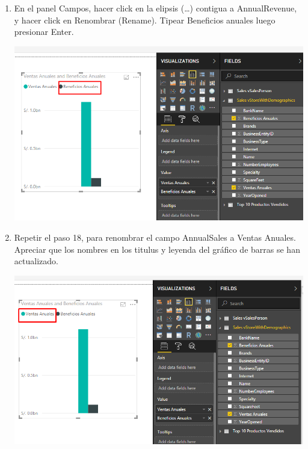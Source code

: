 \begin{itemize}
\begin{enumerate}
\item En el panel Campos, hacer click en la elipsis (…) contigua a AnnualRevenue, y hacer click en Renombrar (Rename). Tipear Beneficios anuales luego presionar Enter.
\begin{center}
\includegraphics[scale=0.55]{./Imagenes/18.png}
\end{center}

\item Repetir el paso 18, para renombrar el campo AnnualSales a Ventas Anuales. Apreciar que los nombres en los titulus y leyenda del gráfico de barras se han actualizado.
\begin{center}
\includegraphics[scale=0.55]{./Imagenes/19.png}
\end{center}


\end{enumerate}
\end{itemize}
